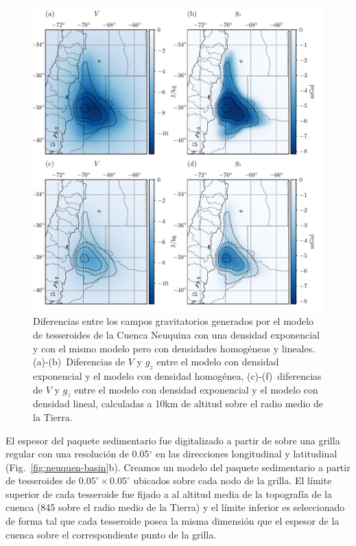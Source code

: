 \begin{figure}
\centering
\includegraphics[width=\linewidth]{figs/tesseroids-variable-density/neuquen-basin-diffs.pdf}
\caption{
    Diferencias entre los campos gravitatorios generados por el modelo de
    tesseroides de la Cuenca Neuquina con una densidad exponencial y con el
    mismo modelo pero con densidades homogéneas y lineales.
    \mbox{(a)-(b)}~Diferencias de $V$ y $g_z$ entre el modelo con densidad
    exponencial y el modelo con densidad homogénea,
    \mbox{(c)-(f)}~diferencias de $V$ y $g_z$ entre el modelo con densidad
    exponencial y el modelo con densidad lineal,
    calculadas a 10km de altitud sobre el radio medio de la Tierra.
}
\label{fig:neuquen-basin-diffs}
\end{figure}

El espesor del paquete sedimentario fue digitalizado a partir de
\citet{heine2007} sobre una grilla regular con una resolución de 0.05$^\circ$
en las direcciones longitudinal y latitudinal (Fig.~\ref{fig:neuquen-basin}b).
Creamos un modelo del paquete sedimentario a partir de tesseroides de
$0.05^\circ \times 0.05^\circ$ ubicados sobre cada nodo de la grilla.
El límite superior de cada tesseroide fue fijado a al altitud media de la
topografía de la cuenca (845\m{} sobre el radio medio de la Tierra) y el límite
inferior es seleccionado de forma tal que cada tesseroide posea la misma
dimensión que el espesor de la cuenca sobre el correspondiente punto de la
grilla.

